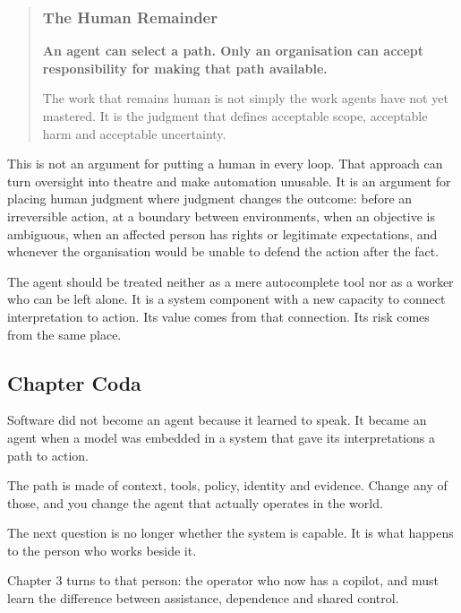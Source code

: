 \begin{quote}
\subsubsection{The Human Remainder}\label{the-human-remainder-1}

\textbf{An agent can select a path. Only an organisation can accept
responsibility for making that path available.}

The work that remains human is not simply the work agents have not yet
mastered. It is the judgment that defines acceptable scope, acceptable
harm and acceptable uncertainty.
\end{quote}

This is not an argument for putting a human in every loop. That approach
can turn oversight into theatre and make automation unusable. It is an
argument for placing human judgment where judgment changes the outcome:
before an irreversible action, at a boundary between environments, when
an objective is ambiguous, when an affected person has rights or
legitimate expectations, and whenever the organisation would be unable
to defend the action after the fact.

The agent should be treated neither as a mere autocomplete tool nor as a
worker who can be left alone. It is a system component with a new
capacity to connect interpretation to action. Its value comes from that
connection. Its risk comes from the same place.

\subsection{Chapter Coda}\label{chapter-coda}

Software did not become an agent because it learned to speak. It became
an agent when a model was embedded in a system that gave its
interpretations a path to action.

The path is made of context, tools, policy, identity and evidence.
Change any of those, and you change the agent that actually operates in
the world.

The next question is no longer whether the system is capable. It is what
happens to the person who works beside it.

Chapter 3 turns to that person: the operator who now has a copilot, and
must learn the difference between assistance, dependence and shared
control.

